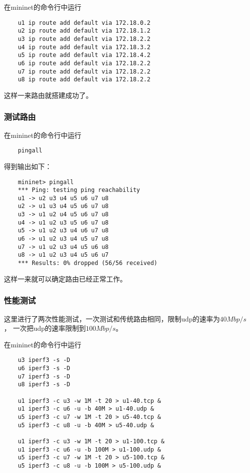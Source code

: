 在mininet的命令行中运行

\begin{lstlisting}
	u1 ip route add default via 172.18.0.2 
	u2 ip route add default via 172.18.1.2
	u3 ip route add default via 172.18.2.2
	u4 ip route add default via 172.18.3.2
	u5 ip route add default via 172.18.4.2
	u6 ip route add default via 172.18.2.2
	u7 ip route add default via 172.18.2.2
	u8 ip route add default via 172.18.2.2
\end{lstlisting}

这样一来路由就搭建成功了。

\subsubsection{测试路由}

在mininet的命令行中运行

\begin{lstlisting}
	pingall
\end{lstlisting}

得到输出如下：

\begin{lstlisting}
	mininet> pingall
	*** Ping: testing ping reachability
	u1 -> u2 u3 u4 u5 u6 u7 u8 
	u2 -> u1 u3 u4 u5 u6 u7 u8 
	u3 -> u1 u2 u4 u5 u6 u7 u8 
	u4 -> u1 u2 u3 u5 u6 u7 u8 
	u5 -> u1 u2 u3 u4 u6 u7 u8 
	u6 -> u1 u2 u3 u4 u5 u7 u8 
	u7 -> u1 u2 u3 u4 u5 u6 u8 
	u8 -> u1 u2 u3 u4 u5 u6 u7 
	*** Results: 0% dropped (56/56 received)
\end{lstlisting}

这样一来就可以确定路由已经正常工作。

\subsubsection{性能测试}

这里进行了两次性能测试，一次测试和传统路由相同，限制udp的速率为$40 Mbp/s$，
一次把udp的速率限制到$100 Mbp/s$。

在mininet的命令行中运行

\begin{lstlisting}
	u3 iperf3 -s -D
	u6 iperf3 -s -D
	u7 iperf3 -s -D
	u8 iperf3 -s -D

	u1 iperf3 -c u3 -w 1M -t 20 > u1-40.tcp &
	u1 iperf3 -c u6 -u -b 40M > u1-40.udp &
	u5 iperf3 -c u7 -w 1M -t 20 > u5-40.tcp &
	u5 iperf3 -c u8 -u -b 40M > u5-40.udp &

	u1 iperf3 -c u3 -w 1M -t 20 > u1-100.tcp &
	u1 iperf3 -c u6 -u -b 100M > u1-100.udp &
	u5 iperf3 -c u7 -w 1M -t 20 > u5-100.tcp &
	u5 iperf3 -c u8 -u -b 100M > u5-100.udp &
\end{lstlisting}

